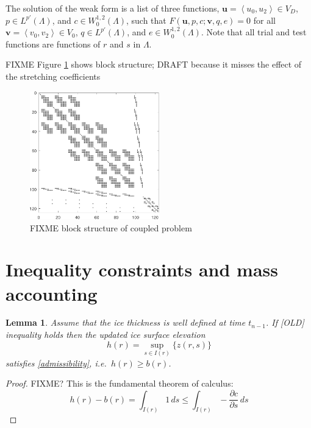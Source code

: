 \documentclass[letterpaper,final,12pt,reqno]{amsart}
\newcommand{\bu}{\mathbf{u}}
\newcommand{\bv}{\mathbf{v}}
\newtheorem{lemma}{Lemma}
\begin{document}
The solution of the weak form is a list of three functions, $\bu = \left<u_0,u_2\right> \in V_D$, $p\in L^{p'}(\Lambda)$, and $c\in W^{1,2}_0(\Lambda)$, such that $F(\bu,p,c;\bv,q,e) = 0$ for all $\bv = \left<v_0,v_2\right> \in V_0$,  $q\in L^{p'}(\Lambda)$, and $e \in W^{1,2}_0(\Lambda)$.  Note that all trial and test functions are functions of $r$ and $s$ in $\Lambda$.

FIXME Figure \ref{fig:blockstructure} shows block structure; DRAFT because it misses the effect of the stretching coefficients

\begin{figure}[ht]
\begin{center}
\includegraphics[width=0.5\textwidth]{coarsespy.pdf}
\end{center}
\caption{FIXME block structure of coupled problem}
\label{fig:blockstructure}
\end{figure}


\section{Inequality constraints and mass accounting} \label{sec:inequalities}

\begin{lemma}
Assume that the ice thickness is well defined at time $t_{n-1}$.  If [OLD] inequality holds then the updated ice surface elevation
    $$h(r) = \sup_{s\in I(r)}\{z(r,s)\}$$
satisfies \eqref{admissibility}, i.e.~$h(r)\ge b(r)$.
\end{lemma}

\begin{proof}
FIXME? This is the fundamental theorem of calculus:
    $$h(r) - b(r) = \int_{I(r)} 1\,ds \le \int_{I(r)} - \frac{\partial c}{\partial s}\,ds$$
\end{proof}
\end{document}
